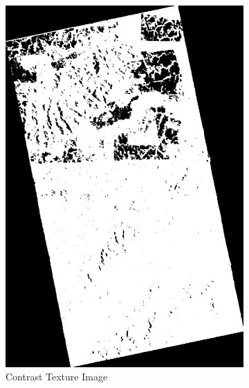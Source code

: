 \begin{figure}
\begin{subfigure}[b]{0.4\linewidth}
      \includegraphics[width=\linewidth]{Cap3-Results/sum_and_diff_textures/contrastimage.png}
       \caption{Contrast Texture Image}
    \end{subfigure}
    \centering
    \begin{subfigure}[b]{0.4\linewidth}

\end{subfigure}
\end{figure}
